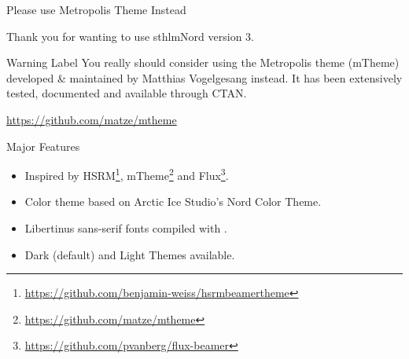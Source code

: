 \documentclass[aspectratio=169, sectionpages]{beamer}
\begin{document}
\begin{frame}{Please use Metropolis Theme Instead}

	Thank you for wanting to use sthlmNord version 3.

	\vspace{1em}
	\begin{alertblock}{Warning Label}
		\alert{You really should consider} using the Metropolis
		theme (mTheme) developed \& maintained by Matthias
		Vogelgesang instead. It has been extensively tested, documented and available through CTAN.
	\end{alertblock}
	\begin{center}
		\url{https://github.com/matze/mtheme}
	\end{center}
\end{frame}


\begin{frame}[c,fragile]{Major Features}

	\begin{itemize}
		\item Inspired by HSRM\footnote{\url{https://github.com/benjamin-weiss/hsrmbeamertheme}},
		      mTheme\footnote{\url{https://github.com/matze/mtheme}} and
		      Flux\footnote{\url{https://github.com/pvanberg/flux-beamer}}.
		\item Color theme based on Arctic Ice Studio's Nord Color Theme.
		\item Libertinus sans-serif fonts compiled with \XeLaTeX.
		\item Dark (default) and Light Themes available.
	\end{itemize}

\end{frame}
\end{document}
